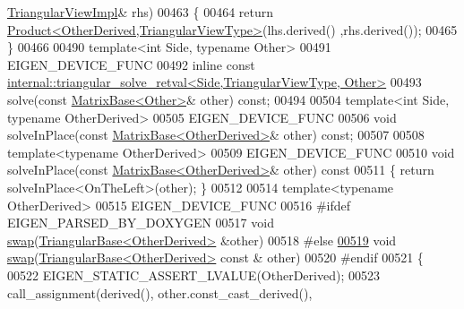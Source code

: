 \begin{DoxyCode}
      \hyperlink{class_eigen_1_1_triangular_view_impl}{TriangularViewImpl}& rhs)
00463     \{
00464       \textcolor{keywordflow}{return} \hyperlink{group___core___module_class_eigen_1_1_product}{Product<OtherDerived,TriangularViewType>}(lhs.derived()
      ,rhs.derived());
00465     \}
00466 
00490     \textcolor{keyword}{template}<\textcolor{keywordtype}{int} S\textcolor{keywordtype}{id}e, \textcolor{keyword}{typename} Other>
00491     EIGEN\_DEVICE\_FUNC
00492     \textcolor{keyword}{inline} \textcolor{keyword}{const} 
      \hyperlink{struct_eigen_1_1internal_1_1triangular__solve__retval}{internal::triangular\_solve\_retval<Side,TriangularViewType, Other>}
00493     solve(\textcolor{keyword}{const} \hyperlink{group___core___module_class_eigen_1_1_matrix_base}{MatrixBase<Other>}& other) \textcolor{keyword}{const};
00494 
00504     \textcolor{keyword}{template}<\textcolor{keywordtype}{int} S\textcolor{keywordtype}{id}e, \textcolor{keyword}{typename} OtherDerived>
00505     EIGEN\_DEVICE\_FUNC
00506     \textcolor{keywordtype}{void} solveInPlace(\textcolor{keyword}{const} \hyperlink{group___core___module_class_eigen_1_1_matrix_base}{MatrixBase<OtherDerived>}& other) \textcolor{keyword}{const};
00507 
00508     \textcolor{keyword}{template}<\textcolor{keyword}{typename} OtherDerived>
00509     EIGEN\_DEVICE\_FUNC
00510     \textcolor{keywordtype}{void} solveInPlace(\textcolor{keyword}{const} \hyperlink{group___core___module_class_eigen_1_1_matrix_base}{MatrixBase<OtherDerived>}& other)\textcolor{keyword}{ const}
00511 \textcolor{keyword}{    }\{ \textcolor{keywordflow}{return} solveInPlace<OnTheLeft>(other); \}
00512 
00514     \textcolor{keyword}{template}<\textcolor{keyword}{typename} OtherDerived>
00515     EIGEN\_DEVICE\_FUNC
00516 \textcolor{preprocessor}{#ifdef EIGEN\_PARSED\_BY\_DOXYGEN}
00517     \textcolor{keywordtype}{void} \hyperlink{endian_8c_a3ca5ecd34b04d6a243c054ac3a57f68d}{swap}(\hyperlink{group___core___module_class_eigen_1_1_triangular_base}{TriangularBase<OtherDerived>} &other)
00518 \textcolor{preprocessor}{#else}
\hyperlink{group___core___module_a154127e98e3b30d829220c61eb3c12b1}{00519}     \textcolor{keywordtype}{void} \hyperlink{group___core___module_a154127e98e3b30d829220c61eb3c12b1}{swap}(\hyperlink{group___core___module_class_eigen_1_1_triangular_base}{TriangularBase<OtherDerived>} \textcolor{keyword}{const} & other)
00520 \textcolor{preprocessor}{#endif}
00521     \{
00522       EIGEN\_STATIC\_ASSERT\_LVALUE(OtherDerived);
00523       call\_assignment(derived(), other.const\_cast\_derived(), 

\end{DoxyCode}

